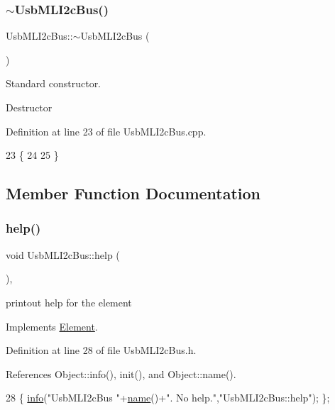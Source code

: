 \subsubsection{\texorpdfstring{$\sim$\+Usb\+M\+L\+I2c\+Bus()}{~UsbMLI2cBus()}}
{\footnotesize\ttfamily Usb\+M\+L\+I2c\+Bus\+::$\sim$\+Usb\+M\+L\+I2c\+Bus (\begin{DoxyParamCaption}{ }\end{DoxyParamCaption})\hspace{0.3cm}{\ttfamily [virtual]}}



Standard constructor. 

Destructor 

Definition at line 23 of file Usb\+M\+L\+I2c\+Bus.\+cpp.


\begin{DoxyCode}
23                           \{
24 
25 \}
\end{DoxyCode}


\subsection{Member Function Documentation}
\mbox{\label{classUsbMLI2cBus_aeb2b5e4169c6847942ae89e5bf476c79}} 
\subsubsection{\texorpdfstring{help()}{help()}}
{\footnotesize\ttfamily void Usb\+M\+L\+I2c\+Bus\+::help (\begin{DoxyParamCaption}{ }\end{DoxyParamCaption})\hspace{0.3cm}{\ttfamily [inline]}, {\ttfamily [virtual]}}

printout help for the element 

Implements \hyperlink{classElement_a32c0de27acb08e17251cef88c3e9303a}{Element}.



Definition at line 28 of file Usb\+M\+L\+I2c\+Bus.\+h.



References Object\+::info(), init(), and Object\+::name().


\begin{DoxyCode}
28 \{ \hyperlink{classObject_a644fd329ea4cb85f54fa6846484b84a8}{info}(\textcolor{stringliteral}{"UsbMLI2cBus "}+\hyperlink{classObject_a300f4c05dd468c7bb8b3c968868443c1}{name}()+\textcolor{stringliteral}{". No help."},\textcolor{stringliteral}{"UsbMLI2cBus::help"}); \};
\end{DoxyCode}
\mbox{\label{classUsbMLI2cBus_ad212b393510dbc3ca5b13981e1cdc0b3}} 

